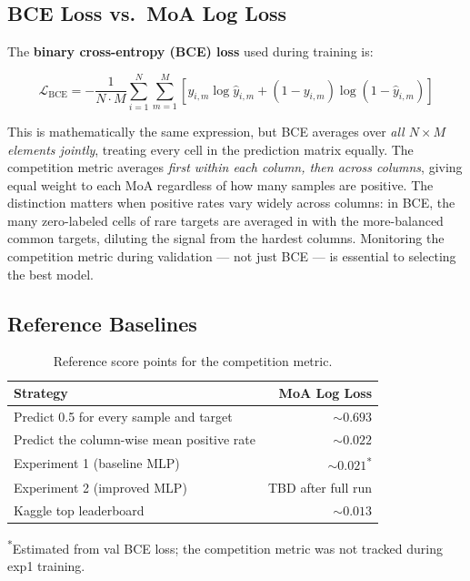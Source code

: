 \documentclass[12pt, a4paper]{article}
\begin{document}
\subsection{BCE Loss vs.\ MoA Log Loss}

The \textbf{binary cross-entropy (BCE) loss} used during training is:

\begin{equation}
\mathcal{L}_{\text{BCE}} = -\frac{1}{N \cdot M} \sum_{i=1}^{N} \sum_{m=1}^{M} \left[ y_{i,m} \log \hat{y}_{i,m} + (1 - y_{i,m}) \log(1 - \hat{y}_{i,m}) \right]
\end{equation}

This is mathematically the same expression, but BCE averages over \emph{all $N \times M$ elements jointly}, treating every cell in the prediction matrix equally. The competition metric averages \emph{first within each column, then across columns}, giving equal weight to each MoA regardless of how many samples are positive. The distinction matters when positive rates vary widely across columns: in BCE, the many zero-labeled cells of rare targets are averaged in with the more-balanced common targets, diluting the signal from the hardest columns. Monitoring the competition metric during validation — not just BCE — is essential to selecting the best model.

\subsection{Reference Baselines}

\begin{table}[h!]
\centering
\caption{Reference score points for the competition metric.}
\label{tab:baselines}
\begin{tabular}{lr}
\toprule
\textbf{Strategy} & \textbf{MoA Log Loss} \\
\midrule
Predict 0.5 for every sample and target & $\sim 0.693$ \\
Predict the column-wise mean positive rate & $\sim 0.022$ \\
Experiment 1 (baseline MLP) & $\sim 0.021$\textsuperscript{*} \\
Experiment 2 (improved MLP) & TBD after full run \\
Kaggle top leaderboard & $\sim 0.013$ \\
\bottomrule
\end{tabular}
\vspace{0.3em}
{\small \textsuperscript{*}Estimated from val BCE loss; the competition metric was not tracked during exp1 training.}
\end{table}
\end{document}
